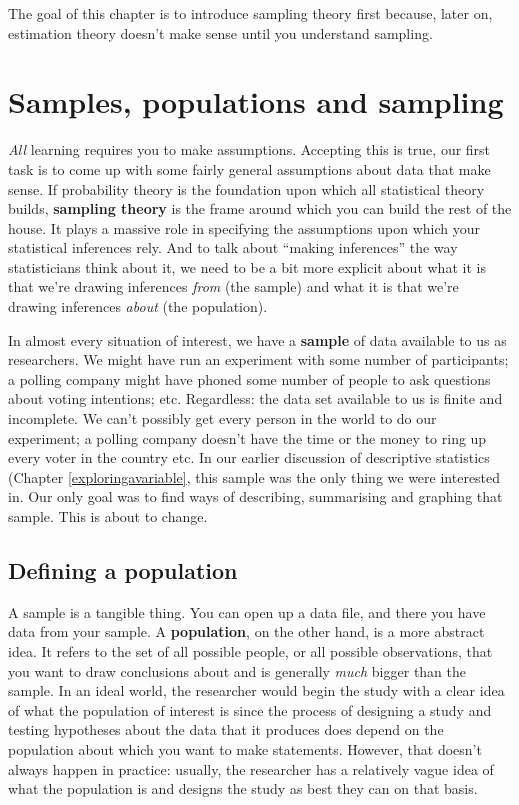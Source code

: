 \documentclass[
  11pt,
  a4paper,
  twoside,symmetric,openright]{book}
\theoremstyle{break}
\theoremstyle{break}
\begin{document}
The goal of this chapter is to introduce sampling theory first because, later on, estimation theory doesn't make sense until you understand sampling.

\section{Samples, populations and sampling}\label{srs}

\emph{All} learning requires you to make assumptions. Accepting this is true, our first task is to come up with some fairly general assumptions about data that make sense. If probability theory is the foundation upon which all statistical theory builds, \textbf{sampling theory} is the frame around which you can build the rest of the house. It plays a massive role in specifying the assumptions upon which your statistical inferences rely. And to talk about ``making inferences'' the way statisticians think about it, we need to be a bit more explicit about what it is that we're drawing inferences \emph{from} (the sample) and what it is that we're drawing inferences \emph{about} (the population).

In almost every situation of interest, we have a \textbf{sample} of data available to us as researchers. We might have run an experiment with some number of participants; a polling company might have phoned some number of people to ask questions about voting intentions; etc. Regardless: the data set available to us is finite and incomplete. We can't possibly get every person in the world to do our experiment; a polling company doesn't have the time or the money to ring up every voter in the country etc. In our earlier discussion of descriptive statistics (Chapter \ref{exploringavariable}, this sample was the only thing we were interested in. Our only goal was to find ways of describing, summarising and graphing that sample. This is about to change.

\subsection{Defining a population}\label{pop}

A sample is a tangible thing. You can open up a data file, and there you have data from your sample. A \textbf{population}, on the other hand, is a more abstract idea. It refers to the set of all possible people, or all possible observations, that you want to draw conclusions about and is generally \emph{much} bigger than the sample. In an ideal world, the researcher would begin the study with a clear idea of what the population of interest is since the process of designing a study and testing hypotheses about the data that it produces does depend on the population about which you want to make statements. However, that doesn't always happen in practice: usually, the researcher has a relatively vague idea of what the population is and designs the study as best they can on that basis.
\end{document}
